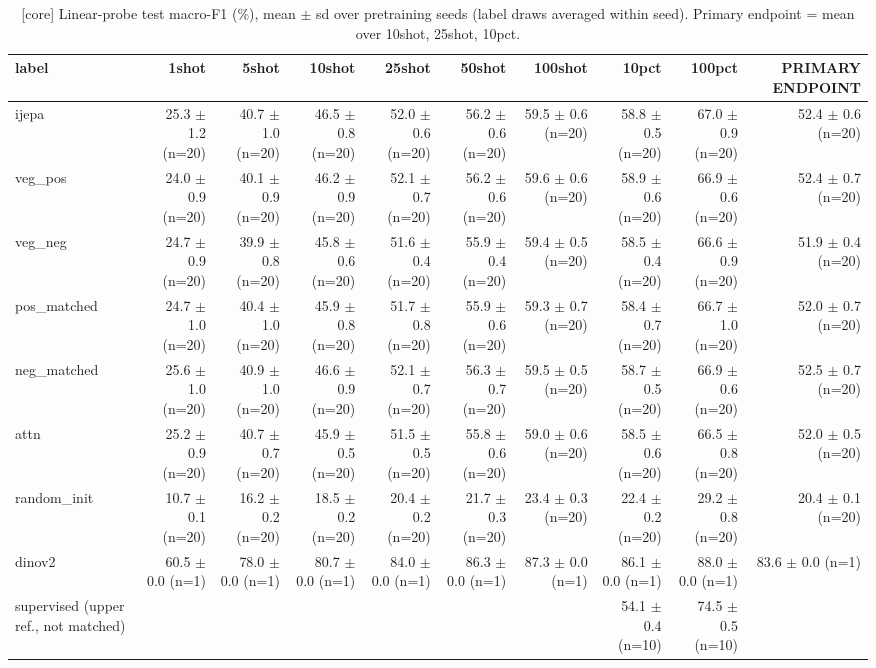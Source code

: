 \begin{table}[t]
\centering
\small
\caption{[core] Linear-probe test macro-F1 (\%), mean $\pm$ sd over pretraining seeds (label draws averaged within seed). Primary endpoint = mean over 10shot, 25shot, 10pct.}
\label{tab:main_results_probe}
\begin{tabular}{lrrrrrrrrr}
\toprule
label & 1shot & 5shot & 10shot & 25shot & 50shot & 100shot & 10pct & 100pct & PRIMARY ENDPOINT \\
\midrule
ijepa & 25.3 $\pm$ 1.2 (n=20) & 40.7 $\pm$ 1.0 (n=20) & 46.5 $\pm$ 0.8 (n=20) & 52.0 $\pm$ 0.6 (n=20) & 56.2 $\pm$ 0.6 (n=20) & 59.5 $\pm$ 0.6 (n=20) & 58.8 $\pm$ 0.5 (n=20) & 67.0 $\pm$ 0.9 (n=20) & 52.4 $\pm$ 0.6 (n=20) \\
veg\_pos & 24.0 $\pm$ 0.9 (n=20) & 40.1 $\pm$ 0.9 (n=20) & 46.2 $\pm$ 0.9 (n=20) & 52.1 $\pm$ 0.7 (n=20) & 56.2 $\pm$ 0.6 (n=20) & 59.6 $\pm$ 0.6 (n=20) & 58.9 $\pm$ 0.6 (n=20) & 66.9 $\pm$ 0.6 (n=20) & 52.4 $\pm$ 0.7 (n=20) \\
veg\_neg & 24.7 $\pm$ 0.9 (n=20) & 39.9 $\pm$ 0.8 (n=20) & 45.8 $\pm$ 0.6 (n=20) & 51.6 $\pm$ 0.4 (n=20) & 55.9 $\pm$ 0.4 (n=20) & 59.4 $\pm$ 0.5 (n=20) & 58.5 $\pm$ 0.4 (n=20) & 66.6 $\pm$ 0.9 (n=20) & 51.9 $\pm$ 0.4 (n=20) \\
pos\_matched & 24.7 $\pm$ 1.0 (n=20) & 40.4 $\pm$ 1.0 (n=20) & 45.9 $\pm$ 0.8 (n=20) & 51.7 $\pm$ 0.8 (n=20) & 55.9 $\pm$ 0.6 (n=20) & 59.3 $\pm$ 0.7 (n=20) & 58.4 $\pm$ 0.7 (n=20) & 66.7 $\pm$ 1.0 (n=20) & 52.0 $\pm$ 0.7 (n=20) \\
neg\_matched & 25.6 $\pm$ 1.0 (n=20) & 40.9 $\pm$ 1.0 (n=20) & 46.6 $\pm$ 0.9 (n=20) & 52.1 $\pm$ 0.7 (n=20) & 56.3 $\pm$ 0.7 (n=20) & 59.5 $\pm$ 0.5 (n=20) & 58.7 $\pm$ 0.5 (n=20) & 66.9 $\pm$ 0.6 (n=20) & 52.5 $\pm$ 0.7 (n=20) \\
attn & 25.2 $\pm$ 0.9 (n=20) & 40.7 $\pm$ 0.7 (n=20) & 45.9 $\pm$ 0.5 (n=20) & 51.5 $\pm$ 0.5 (n=20) & 55.8 $\pm$ 0.6 (n=20) & 59.0 $\pm$ 0.6 (n=20) & 58.5 $\pm$ 0.6 (n=20) & 66.5 $\pm$ 0.8 (n=20) & 52.0 $\pm$ 0.5 (n=20) \\
random\_init & 10.7 $\pm$ 0.1 (n=20) & 16.2 $\pm$ 0.2 (n=20) & 18.5 $\pm$ 0.2 (n=20) & 20.4 $\pm$ 0.2 (n=20) & 21.7 $\pm$ 0.3 (n=20) & 23.4 $\pm$ 0.3 (n=20) & 22.4 $\pm$ 0.2 (n=20) & 29.2 $\pm$ 0.8 (n=20) & 20.4 $\pm$ 0.1 (n=20) \\
dinov2 & 60.5 $\pm$ 0.0 (n=1) & 78.0 $\pm$ 0.0 (n=1) & 80.7 $\pm$ 0.0 (n=1) & 84.0 $\pm$ 0.0 (n=1) & 86.3 $\pm$ 0.0 (n=1) & 87.3 $\pm$ 0.0 (n=1) & 86.1 $\pm$ 0.0 (n=1) & 88.0 $\pm$ 0.0 (n=1) & 83.6 $\pm$ 0.0 (n=1) \\
supervised (upper ref., not matched) &  &  &  &  &  &  & 54.1 $\pm$ 0.4 (n=10) & 74.5 $\pm$ 0.5 (n=10) &  \\
\bottomrule
\end{tabular}
\end{table}
